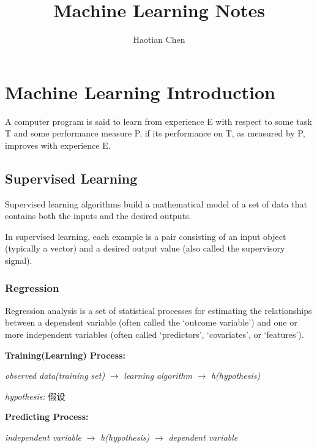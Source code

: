 \documentclass{article}
\title{Machine Learning Notes}
\author{Haotian Chen}
\date{}
\begin{document}
\maketitle

\clearpage

\tableofcontents{}

\clearpage

\section{Machine Learning Introduction}

A computer program is said to learn
from experience E with respect to some task T
and some performance measure P, if its
performance on T, as measured by P, improves
with experience E. 

\subsection{Supervised Learning}

Supervised learning algorithms build a mathematical model 
of a set of data that contains both the inputs and the desired 
outputs.

\bigskip

\noindent In supervised learning, each example is a 
pair consisting of an input object (typically a vector) 
and a desired output value (also called the supervisory signal).

\subsubsection{Regression}

Regression analysis is a set of statistical processes 
for estimating the relationships between a dependent 
variable (often called the `outcome variable') and one 
or more independent variables (often called `predictors', 
`covariates', or `features').

\bigskip

\noindent \textbf{Training(Learning) Process:}

\noindent \textit{observed data(training set)} $\rightarrow$ \textit{learning algorithm} $\rightarrow$ \textit{h(hypothesis)}

\noindent \textit{hypothesis:} 假设

\bigskip

\noindent \textbf{Predicting Process:}

\noindent \textit{independent variable} $\rightarrow$ \textit{h(hypothesis)} $\rightarrow$ \textit{dependent variable}
\end{document}
